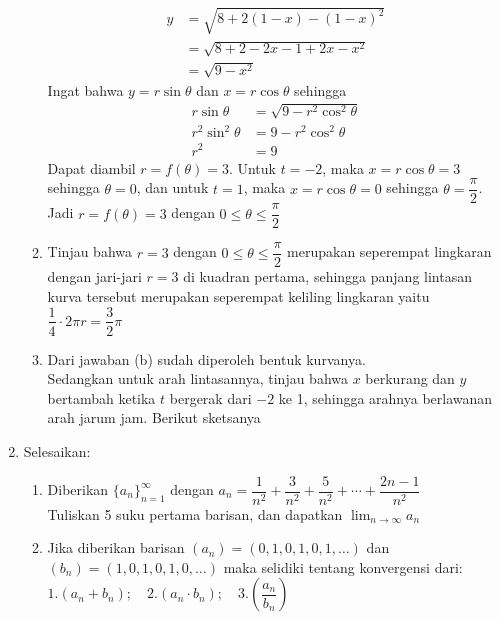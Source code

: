\documentclass{article}
\begin{document}
\begin{enumerate}
\begin{enumerate}
		\begin{align*}
		y&=\sqrt{8+2(1-x)-(1-x)^2}\\
		&=\sqrt{8+2-2x-1+2x-x^2}\\
		&= \sqrt{9-x^2}
		\end{align*}
		Ingat bahwa $y=r\sin\theta$ dan $x=r\cos\theta$ sehingga
		\begin{align*}
		r\sin\theta &=\sqrt{9-r^2\cos^2\theta}\\
		r^2\sin^2\theta &= 9-r^2\cos^2\theta\\
		r^2 &= 9
		\end{align*}
		Dapat diambil $r=f(\theta)=3$. Untuk $t=-2$, maka $x=r\cos\theta=3$ sehingga $\theta=0$, dan untuk $t=1$, maka $x=r\cos\theta=0$ sehingga $\theta=\dfrac{\pi}{2}$. Jadi $r=f(\theta)=3$ dengan $0\leq \theta\leq\dfrac{\pi}{2}$
		\item Tinjau bahwa $r=3$ dengan $0\leq \theta\leq \dfrac{\pi}{2}$ merupakan seperempat lingkaran dengan jari-jari $r=3$ di kuadran pertama, sehingga panjang lintasan kurva tersebut merupakan seperempat keliling lingkaran yaitu $\dfrac{1}{4}\cdot 2\pi r=\dfrac{3}{2}\pi$
		\item Dari jawaban (b) sudah diperoleh bentuk kurvanya.\\
		Sedangkan untuk arah lintasannya, tinjau bahwa $x$ berkurang dan $y$ bertambah ketika $t$ bergerak dari $-2$ ke 1, sehingga arahnya berlawanan arah jarum jam. Berikut sketsanya
		\begin{center}
	\end{center}
	\end{enumerate}
	\item Selesaikan:
	\begin{enumerate}
		\item Diberikan $\{a_n\}^\infty_{n=1}$ dengan $a_n=\dfrac{1}{n^2}+\dfrac{3}{n^2}+\dfrac{5}{n^2}+\cdots +\dfrac{2n-1}{n^2}$\\
		Tuliskan 5 suku pertama barisan, dan dapatkan $\displaystyle \lim_{n\rightarrow \infty} a_n$
		\item Jika diberikan barisan $(a_n)=(0,1,0,1,0,1,\dots)$ dan $(b_n)=(1,0,1,0,1,0,\dots)$ maka selidiki tentang konvergensi dari: $1. (a_n+b_n);\quad 2. (a_n\cdot b_n);\quad 3. \left(\dfrac{a_n}{b_n}\right)$

\end{enumerate}
\end{enumerate}
\end{document}
